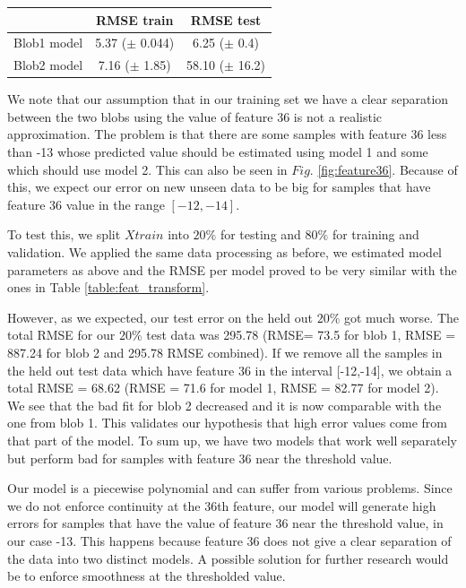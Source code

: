 \begin{center}
  \begin{tabular}{ |l | c | c| }
    \hline
     & RMSE train & RMSE test \\ \hline
    Blob1 model & 5.37 ($\pm$ 0.044) & 6.25 ($\pm$ 0.4) \\ \hline
    Blob2 model & 7.16 ($\pm$ 1.85) & 58.10 ($\pm$ 16.2) \\
    \hline
  \end{tabular}
  	\label{table:feat_transform}
\end{center}

We note that our assumption that in our training set we have a clear separation between the two blobs using the value of feature 36 is not a realistic approximation. The problem is that there are some samples with feature 36 less than -13 whose predicted value should be estimated using model 1 and some which should use model 2. This can also be seen in $Fig.$ \ref{fig:feature36}.
Because of this, we expect our error on new unseen data to be big for samples that have feature 36 value in the range $[-12,-14]$.
 
To test this, we split $Xtrain$ into $20\%$ for testing and $80\%$ for training and validation. We applied the same data processing as before, we estimated model parameters as above and the RMSE per model proved to be very similar with the ones in Table \ref{table:feat_transform}. 

However, as we expected, our test error on the held out $20\%$ got much worse. The total RMSE for our $20\%$  test data was 295.78 (RMSE= 73.5 for blob 1, RMSE = 887.24 for blob 2 and 295.78 RMSE combined).
If we remove all the samples in the held out test data which have feature 36 in the interval [-12,-14], we obtain a total RMSE = 68.62 (RMSE = 71.6 for model 1, RMSE = 82.77 for model 2). We see that the bad fit for blob 2 decreased and it is now comparable with the one from blob 1. This validates our hypothesis that high error values come from that part of the model. To sum up, we have two models that work well separately but perform bad for samples with feature 36 near the threshold value.

Our model is a piecewise polynomial and can suffer from various problems. Since we do not enforce continuity at the 36th feature, our model will generate high errors for samples that have the value of feature 36 near the threshold value, in our case -13. This happens because feature 36 does not give a clear separation of the data into two distinct models. A possible solution for further research would be to enforce smoothness at the thresholded value.

